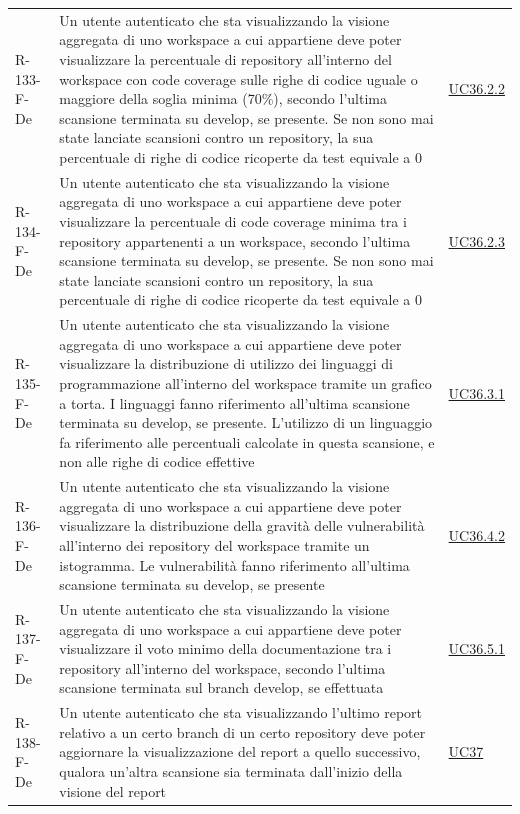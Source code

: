 \documentclass[a4paper, 11pt]{article}
\begin{document}
\begin{longtable}[c]{ >{\centering\arraybackslash}m{2.5cm} >{\centering\arraybackslash}m{8.3cm} >{\centering\arraybackslash}m{3.5cm} }
    R-133-F-De & Un utente autenticato che sta visualizzando la visione aggregata di uno workspace a cui appartiene deve poter visualizzare la percentuale di repository all'interno del workspace con code coverage sulle righe di codice uguale o maggiore della soglia minima (70\%), secondo l'ultima scansione terminata su develop, se presente. Se non sono mai state lanciate scansioni contro un repository, la sua percentuale di righe di codice ricoperte da test equivale a 0 & \hyperref[UC36.2.2]{UC36.2.2}\\
    R-134-F-De & Un utente autenticato che sta visualizzando la visione aggregata di uno workspace a cui appartiene deve poter visualizzare la percentuale di code coverage minima tra i repository appartenenti a un workspace, secondo l'ultima scansione terminata su develop, se presente. Se non sono mai state lanciate scansioni contro un repository, la sua percentuale di righe di codice ricoperte da test equivale a 0 & \hyperref[UC36.2.3]{UC36.2.3}\\
    R-135-F-De & Un utente autenticato che sta visualizzando la visione aggregata di uno workspace a cui appartiene deve poter visualizzare la distribuzione di utilizzo dei linguaggi di programmazione all'interno del workspace tramite un grafico a torta. I linguaggi fanno riferimento all'ultima scansione terminata su develop, se presente. L'utilizzo di un linguaggio fa riferimento alle percentuali calcolate in questa scansione, e non alle righe di codice effettive & \hyperref[UC36.3.1]{UC36.3.1}\\
    R-136-F-De & Un utente autenticato che sta visualizzando la visione aggregata di uno workspace a cui appartiene deve poter visualizzare la distribuzione della gravità delle vulnerabilità all'interno dei repository del workspace tramite un istogramma. Le vulnerabilità fanno riferimento all'ultima scansione terminata su develop, se presente & \hyperref[UC36.4.2]{UC36.4.2}\\
    R-137-F-De & Un utente autenticato che sta visualizzando la visione aggregata di uno workspace a cui appartiene deve poter visualizzare il voto minimo della documentazione tra i repository all'interno del workspace, secondo l'ultima scansione terminata sul branch develop, se effettuata & \hyperref[UC36.5.1]{UC36.5.1}\\
    R-138-F-De & Un utente autenticato che sta visualizzando l'ultimo report relativo a un certo branch di un certo repository deve poter aggiornare la visualizzazione del report a quello successivo, qualora un'altra scansione sia terminata dall'inizio della visione del report & \hyperref[UC37]{UC37}\\

\end{longtable}
\end{document}

